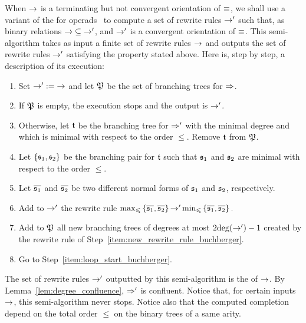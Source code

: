 When $\operatorname{\to}$ is a terminating but not convergent orientation of $\operatorname{\equiv}$,
we shall use a variant of the  for
operads~\cite[Section 3.7]{DK10} to compute a set of rewrite rules
$\operatorname{\to}'$ such that, as binary relations $\operatorname{\to} \subseteq \operatorname{\to}'$, and
$\operatorname{\to}'$ is a convergent orientation of $\operatorname{\equiv}$. This semi-algorithm
takes as input a finite set of rewrite rules $\operatorname{\to}$ and outputs the set
of rewrite rules $\operatorname{\to}'$ satisfying the property stated above. Here is,
step by step, a description of its execution:
\begin{enumerate}[label={(\it\arabic*)}]
    \item Set $\operatorname{\to}' := \operatorname{\to}$ and let $\mathfrak{P}$ be the set of
    branching trees for $\operatorname{\Rightarrow}$.
    \smallbreak

    \item \label{item:loop_start_buchberger}
    If $\mathfrak{P}$ is empty, the execution stops and the output
    is $\operatorname{\to}'$.
    \smallbreak

    \item Otherwise, let $\mathfrak{t}$ be the branching tree for $\operatorname{\Rightarrow}'$
    with the minimal degree and which is minimal with respect to the
    order $\leq$. Remove $\mathfrak{t}$ from $\mathfrak{P}$.
    \smallbreak

    \item Let $\{\mathfrak{s}_1, \mathfrak{s}_2\}$ be the branching pair for $\mathfrak{t}$ such
    that $\mathfrak{s}_1$ and $\mathfrak{s}_2$ are minimal with respect to the
    order $\leq$.
    \smallbreak

    \item Let $\overline{\mathfrak{s}_1}$ and $\overline{\mathfrak{s}_2}$ be two
    different normal forms of $\mathfrak{s}_1$ and $\mathfrak{s}_2$, respectively.
    \smallbreak

    \item \label{item:new_rewrite_rule_buchberger}
    Add to $\operatorname{\to}'$ the rewrite rule
    \begin{math}
        \max_\leqslant \left\{\overline{\mathfrak{s}_1}, \overline{\mathfrak{s}_2}\right\}
        \operatorname{\to}'
        \min_\leqslant \left\{\overline{\mathfrak{s}_1}, \overline{\mathfrak{s}_2}\right\}.
    \end{math}
    \smallbreak

    \item Add to $\mathfrak{P}$ all new branching trees of degrees at
    most $2 \mathrm{deg}(\operatorname{\to}') - 1$ created by the rewrite rule of
    Step~\ref{item:new_rewrite_rule_buchberger}.
    \smallbreak

    \item Go to Step~\ref{item:loop_start_buchberger}.
\end{enumerate}
The set of rewrite rules $\operatorname{\to}'$ outputted by this semi-algorithm is the
 of $\operatorname{\to}$. By Lemma~\ref{lem:degree_confluence},
$\operatorname{\Rightarrow}'$ is confluent. Notice that, for certain inputs $\operatorname{\to}$,
this semi-algorithm never stops. Notice also that the computed
completion depend on the total order $\leq$ on the binary trees of a
same arity.
\medbreak
